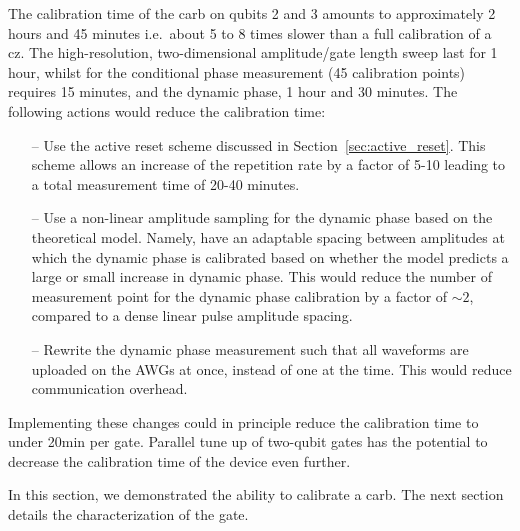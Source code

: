 The calibration time of the \gls{carb} on qubits 2 and 3 amounts to approximately 2 hours and 45 minutes i.e.\ about 5 to 8 times slower than a full calibration of a \gls{cz}. The high-resolution, two-dimensional amplitude/gate length sweep last for 1 hour, whilst for the conditional phase measurement (45 calibration points) requires 15 minutes, and the dynamic phase, 1 hour and 30 minutes. The following actions would reduce the calibration time:
\begin{itemize}
    \item[--] Use the active reset scheme discussed in Section~\ref{sec:active_reset}. This scheme allows an increase of the repetition rate by a factor of 5-10 leading to a total measurement time of 20-40 minutes.
    \item[--] Use a non-linear amplitude sampling for the dynamic phase based on the theoretical model. Namely, have an adaptable spacing between amplitudes at which the dynamic phase is calibrated based on whether the model predicts a large or small increase in dynamic phase. This would reduce the number of measurement point for the dynamic phase calibration by a factor of $\sim2$, compared to a dense linear pulse amplitude spacing.
    \item[--] Rewrite the dynamic phase measurement such that all waveforms are uploaded on the AWGs at once, instead of one at the time. This would reduce communication overhead.
\end{itemize}
Implementing these changes could in principle reduce the calibration time to under 20min per gate. Parallel tune up of two-qubit gates has the potential to decrease the calibration time of the device even further. 

In this section, we demonstrated the ability to calibrate a \gls{carb}. The next section details the characterization of the gate.

